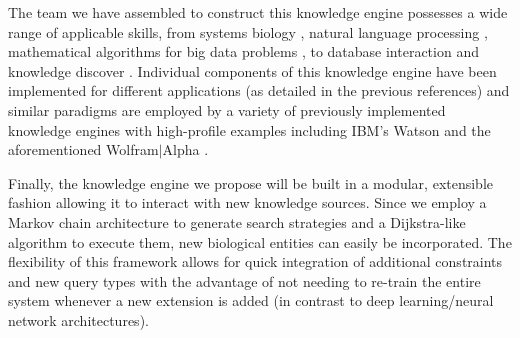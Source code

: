 \documentclass[11pt,notitlepage]{article}
\begin{document}
The team we have assembled to construct this knowledge engine possesses a wide range of applicable skills, from systems biology \cite{ramsey2010systems,hwang2005data1,hwang2005data2,de2004evolution}, natural language processing \cite{huang2012structured,huang2010dynamic,mi2008forest,huang2007forest}, mathematical algorithms for big data problems \cite{koslicki2014wgsquikr,holzinger2014entropy,koslicki2015coding,koslicki2013quikr,koslicki2017improving}, to database interaction and knowledge discover \cite{nandi2011guided,nandi2007effective,jagadish2007making,nandi2007assisted}. Individual components of this knowledge engine have been implemented for different applications (as detailed in the previous references) and similar paradigms are employed by a variety of previously implemented knowledge engines with high-profile examples including IBM's Watson \cite{ferrucci2010building} and the aforementioned Wolfram$|$Alpha \cite{Wolframalpha}.

Finally, the knowledge engine we propose will be built in a modular, extensible fashion allowing it to interact with new knowledge sources. Since we employ a Markov chain architecture to generate search strategies and a Dijkstra-like algorithm to execute them, new biological entities can easily be incorporated. The flexibility of this framework allows for quick integration of additional constraints and new query types with the advantage of not needing to re-train the entire system whenever a new extension is added (in contrast to deep learning/neural network architectures). 
\end{document}
